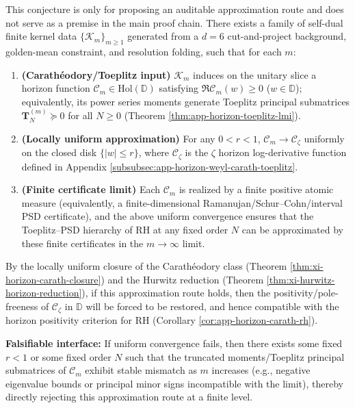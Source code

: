 \begin{conjecture}\label{conj:discussion-kernel-zeta-toeplitz-convergence}
This conjecture is only for proposing an auditable approximation route and does not serve as a premise in the main proof chain.
There exists a family of self-dual finite kernel data \(\{\mathcal{K}_m\}_{m\ge 1}\) generated from a \(d=6\) cut-and-project background, golden-mean constraint, and resolution folding, such that for each \(m\):
\begin{enumerate}
  \item \textbf{(Carath\'eodory/Toeplitz input)}
  \(\mathcal{K}_m\) induces on the unitary slice a horizon function \(\mathscr{C}_m\in\mathrm{Hol}(\mathbb{D})\) satisfying \(\Re\mathscr{C}_m(w)\ge 0\) (\(w\in\mathbb{D}\));
  equivalently, its power series moments generate Toeplitz principal submatrices \(\mathbf{T}^{(m)}_N\succeq 0\) for all \(N\ge 0\) (Theorem \ref{thm:app-horizon-toeplitz-lmi}).
  \item \textbf{(Locally uniform approximation)}
  For any \(0<r<1\), \(\mathscr{C}_m\to \mathscr{C}_\zeta\) uniformly on the closed disk \(\{|w|\le r\}\), where \(\mathscr{C}_\zeta\) is the \(\zeta\) horizon log-derivative function defined in Appendix \ref{subsubsec:app-horizon-weyl-carath-toeplitz}.
  \item \textbf{(Finite certificate limit)}
  Each \(\mathscr{C}_m\) is realized by a finite positive atomic measure (equivalently, a finite-dimensional Ramanujan/Schur--Cohn/interval PSD certificate), and the above uniform convergence ensures that the Toeplitz--PSD hierarchy of RH at any fixed order \(N\) can be approximated by these finite certificates in the \(m\to\infty\) limit.
\end{enumerate}
By the locally uniform closure of the Carath\'eodory class (Theorem \ref{thm:xi-horizon-carath-closure}) and the Hurwitz reduction (Theorem \ref{thm:xi-hurwitz-horizon-reduction}), if this approximation route holds, then the positivity/pole-freeness of \(\mathscr{C}_\zeta\) in \(\mathbb{D}\) will be forced to be restored, and hence compatible with the horizon positivity criterion for RH (Corollary \ref{cor:app-horizon-carath-rh}).
\par
\textbf{Falsifiable interface:} If uniform convergence fails, then there exists some fixed \(r<1\) or some fixed order \(N\) such that the truncated moments/Toeplitz principal submatrices of \(\mathscr{C}_m\) exhibit stable mismatch as \(m\) increases (e.g., negative eigenvalue bounds or principal minor signs incompatible with the limit), thereby directly rejecting this approximation route at a finite level.
\end{conjecture}

